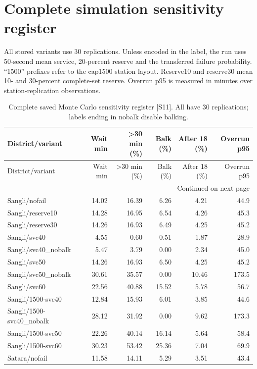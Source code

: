 \documentclass[11pt,a4paper,oneside]{report}
\begin{document}
\chapter{Complete simulation sensitivity register}\label{app:simulation}
All stored variants use 30 replications. Unless encoded in the label, the run uses 50-second mean service, 20-percent reserve and the transferred failure probability. ``1500'' prefixes refer to the cap1500 station layout. Reserve10 and reserve30 mean 10- and 30-percent complete-set reserve. Overrun p95 is measured in minutes over station-replication observations.
\begin{center}
\small
\setlength{\tabcolsep}{5pt}
\begin{longtable}{p{5cm}rrrrr}
\caption{Complete saved Monte Carlo sensitivity register [S11]. All have 30 replications; labels ending in nobalk disable balking.}\\
\toprule
District/variant & Wait min & >30 min (\%) & Balk (\%) & After 18 (\%) & Overrun p95\\
\midrule\endfirsthead
\toprule
District/variant & Wait min & >30 min (\%) & Balk (\%) & After 18 (\%) & Overrun p95\\
\midrule\endhead
\midrule\multicolumn{6}{r}{\footnotesize Continued on next page}\\\endfoot
\bottomrule\endlastfoot
Sangli/nofail & 14.02 & 16.39 & 6.26 & 4.21 & 44.9\\
Sangli/reserve10 & 14.28 & 16.95 & 6.54 & 4.26 & 45.3\\
Sangli/reserve30 & 14.26 & 16.93 & 6.49 & 4.25 & 45.2\\
Sangli/svc40 & 4.55 & 0.60 & 0.51 & 1.87 & 28.9\\
Sangli/svc40\_nobalk & 5.47 & 3.79 & 0.00 & 2.34 & 45.0\\
Sangli/svc50 & 14.26 & 16.93 & 6.50 & 4.25 & 45.2\\
Sangli/svc50\_nobalk & 30.61 & 35.57 & 0.00 & 10.46 & 173.5\\
Sangli/svc60 & 22.56 & 40.88 & 15.52 & 5.78 & 56.7\\
Sangli/1500-svc40 & 12.84 & 15.93 & 6.01 & 3.85 & 44.6\\
Sangli/1500-svc40\_nobalk & 28.12 & 31.92 & 0.00 & 9.62 & 173.3\\
Sangli/1500-svc50 & 22.26 & 40.14 & 16.14 & 5.64 & 58.4\\
Sangli/1500-svc60 & 30.23 & 53.42 & 25.36 & 7.04 & 69.9\\
Satara/nofail & 11.58 & 14.11 & 5.29 & 3.51 & 43.4\\

\end{longtable}
\end{center}
\end{document}
